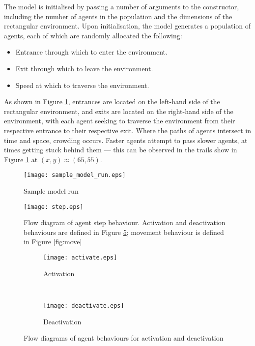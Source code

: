 The model is initialised by passing a number of arguments to the constructor,
including the number of agents in the population and the dimensions of the
rectangular environment.
Upon initialisation, the model generates a population of agents, each of which
are randomly allocated the following:
\begin{itemize}
    \item Entrance through which to enter the environment.
    \item Exit through which to leave the environment.
    \item Speed at which to traverse the environment.
\end{itemize}
As shown in Figure \ref{fig:sample_model_run}, entrances are located on the
left-hand side of the rectangular environment, and exits are located on the
right-hand side of the environment, with each agent seeking to traverse the
environment from their respective entrance to their respective exit.
Where the paths of agents intersect in time and space, crowding occurs.
Faster agents attempt to pass slower agents, at times getting stuck behind them
--- this can be observed in the trails show in Figure \ref{fig:sample_model_run}
at $(x, y) \approx (65, 55)$.


\begin{figure}[h]
    \centering
    \texttt{[image: sample\_model\_run.eps]}
    \caption{Sample model run}\label{fig:sample_model_run}
\end{figure}

\begin{figure}[h]
    \centering
    \texttt{[image: step.eps]}
    \caption{Flow diagram of agent step behaviour. Activation and deactivation
        behaviours are defined in Figure \ref{fig:act_deact}; movement behaviour
    is defined in Figure \ref{fig:move}}\label{fig:step}
\end{figure}

\begin{figure}[h]
    \centering
    \begin{subfigure}[h]{0.4\textwidth}
        \texttt{[image: activate.eps]}
        \caption{Activation}\label{fig:act_deact:act}
    \end{subfigure}
    ~
    \begin{subfigure}[h]{0.3\textwidth}
        \texttt{[image: deactivate.eps]}
        \caption{Deactivation}\label{fig:act_deact:deact}
    \end{subfigure}
    \caption{Flow diagrams of agent behaviours for activation and deactivation}
    \label{fig:act_deact}
\end{figure}

